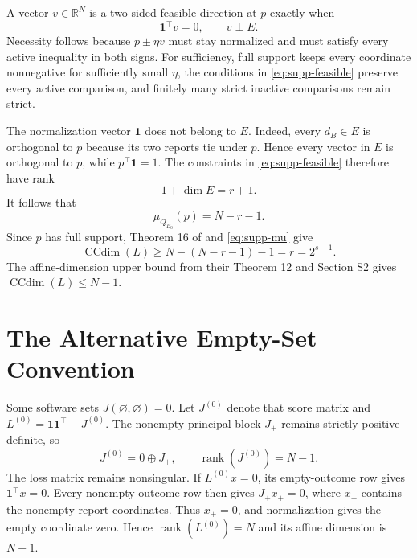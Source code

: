 \documentclass[twoside]{article}
\newcommand{\CCdim}{\operatorname{CCdim}}
\newcommand{\rank}{\operatorname{rank}}
\newcommand{\1}{\mathbf 1}
\begin{document}
A vector $v\in\mathbb R^N$ is a two-sided feasible direction at $p$ exactly when
\begin{equation}
\1^\top v=0,
\qquad
v\perp E.
\label{eq:supp-feasible}
\end{equation}
Necessity follows because $p\pm\eta v$ must stay normalized and must satisfy every active inequality in both signs. For sufficiency, full support keeps every coordinate nonnegative for sufficiently small $\eta$, the conditions in \eqref{eq:supp-feasible} preserve every active comparison, and finitely many strict inactive comparisons remain strict.

The normalization vector $\1$ does not belong to $E$. Indeed, every $d_B\in E$ is orthogonal to $p$ because its two reports tie under $p$. Hence every vector in $E$ is orthogonal to $p$, while $p^\top\1=1$. The constraints in \eqref{eq:supp-feasible} therefore have rank
\begin{equation}
1+\dim E=r+1.
\end{equation}
It follows that
\begin{equation}
\mu_{Q_{B_0}}(p)=N-r-1.
\label{eq:supp-mu}
\end{equation}
Since $p$ has full support, Theorem 16 of \citet{ramaswamy2016convex} and \eqref{eq:supp-mu} give
\begin{equation}
\CCdim(L)
\geq N-(N-r-1)-1
=r
=2^{s-1}.
\end{equation}
The affine-dimension upper bound from their Theorem 12 and Section S2 gives $\CCdim(L)\leq N-1$.

\section{The Alternative Empty-Set Convention}

Some software sets $J(\varnothing,\varnothing)=0$. Let $J^{(0)}$ denote that score matrix and $L^{(0)}=\1\1^\top-J^{(0)}$. The nonempty principal block $J_+$ remains strictly positive definite, so
\begin{equation}
J^{(0)}=0\oplus J_+,
\qquad
\rank(J^{(0)})=N-1.
\end{equation}
The loss matrix remains nonsingular. If $L^{(0)}x=0$, its empty-outcome row gives $\1^\top x=0$. Every nonempty-outcome row then gives $J_+x_+=0$, where $x_+$ contains the nonempty-report coordinates. Thus $x_+=0$, and normalization gives the empty coordinate zero. Hence $\rank(L^{(0)})=N$ and its affine dimension is $N-1$.
\end{document}
